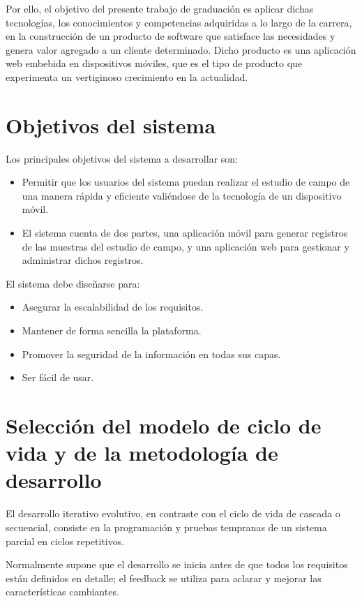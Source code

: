 Por ello, el objetivo del presente trabajo de graduación es aplicar dichas tecnologías, los conocimientos y competencias adquiridas a lo largo de la carrera, en la construcción de un producto de software que satisface las necesidades y genera valor agregado a un cliente determinado. Dicho producto es una aplicación web embebida en dispositivos móviles, que es el tipo de producto que experimenta un vertiginoso crecimiento en la actualidad.  \newpage


\section{Objetivos del sistema}

Los principales objetivos del sistema a desarrollar son:

\begin{itemize}
    \item Permitir que los usuarios del sistema puedan realizar el estudio de campo de una manera rápida y eficiente valiéndose de la tecnología de un dispositivo móvil.
    \item El sistema cuenta de dos partes, una aplicación móvil para generar registros de las muestras del estudio de campo, y una aplicación web para gestionar y administrar dichos registros.
\end{itemize}

El sistema debe diseñarse para:

\begin{itemize}
    \item Asegurar la escalabilidad de los requisitos.
    \item Mantener de forma sencilla la plataforma.
    \item Promover la seguridad de la información en todas sus capas.
    \item Ser fácil de usar.
\end{itemize}

\section{Selección del modelo de ciclo de vida y de la metodología de desarrollo}

El desarrollo iterativo evolutivo, en contraste con el ciclo de vida de cascada o secuencial, consiste en la programación y pruebas tempranas de un sistema parcial en ciclos repetitivos. 

Normalmente supone que el desarrollo se inicia antes de que todos los requisitos están definidos en detalle; el feedback se utiliza para aclarar y mejorar las características cambiantes.

